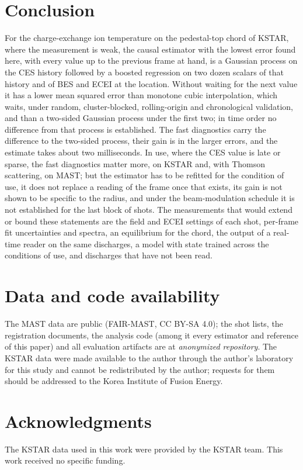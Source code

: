 \documentclass[11pt,a4paper]{article}
\begin{document}
\section{Conclusion}
\label{sec:conclusion}

For the charge-exchange ion temperature on the pedestal-top chord of KSTAR, where the
measurement is weak, the causal estimator with the lowest error found here, with every
value up to the previous frame at hand, is a Gaussian
process on the CES history followed by a boosted regression on two dozen scalars of that
history and of BES and ECEI at the location. Without waiting for the next value it has a
lower mean squared error than monotone cubic interpolation, which waits, under random,
cluster-blocked, rolling-origin and chronological validation, and than a two-sided
Gaussian process under the first two; in time order no difference from that process is
established. The
fast diagnostics carry the difference to the two-sided process, their gain is in the
larger errors, and the estimate takes about two milliseconds. In use, where the CES value
is late or sparse, the fast diagnostics matter more, on KSTAR and, with Thomson
scattering, on MAST; but the estimator has to be refitted for the condition of use, it
does not replace a reading of the frame once that exists, its gain is not shown to be
specific to the radius, and under the beam-modulation schedule it is not established for
the last block of shots. The measurements that would extend or bound these statements are
the field and ECEI settings of each shot, per-frame fit uncertainties and spectra, an
equilibrium for the chord, the output of a real-time reader on the same discharges, a
model with state trained across the conditions of use, and discharges that have not been
read.

\section*{Data and code availability}
The MAST data are public (FAIR-MAST, CC BY-SA 4.0); the shot lists, the registration
documents, the analysis code (among it every estimator and reference of this paper) and
all evaluation artifacts are at \textit{anonymized repository}.
The KSTAR data were made available to the author through the author's laboratory for this
study and cannot be redistributed by the author; requests for them should be addressed to
the Korea Institute of Fusion Energy.

\section*{Acknowledgments}
The KSTAR data used in this work were provided by the KSTAR team. This work received no
specific funding.



\end{document}
